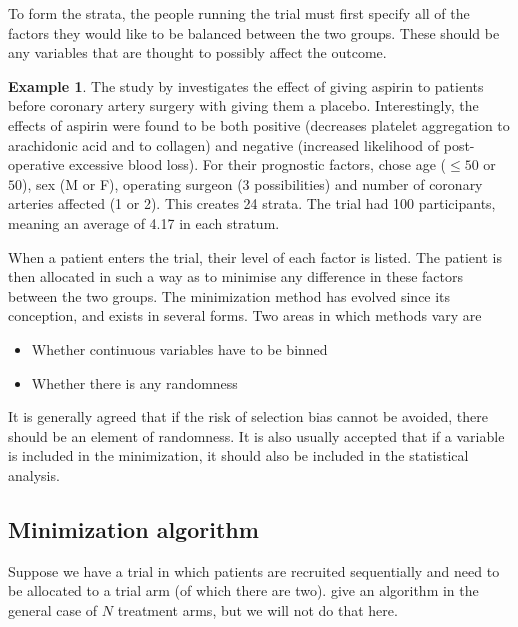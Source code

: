\documentclass[
  openany]{book}
\providecommand{\tightlist}{%
  \setlength{\itemsep}{0pt}\setlength{\parskip}{0pt}}
\theoremstyle{definition}
\theoremstyle{definition}
\newtheorem{example}{Example}[chapter]
\theoremstyle{definition}
\theoremstyle{definition}
\theoremstyle{remark}
\begin{document}
To form the strata, the people running the trial must first specify all of the factors they would like to be balanced between the two groups. These should be any variables that are thought to possibly affect the outcome.

\begin{example}
The study by \citet{kallis1994pre} investigates the effect of giving aspirin to patients before coronary artery surgery with giving them a placebo. Interestingly, the effects of aspirin were found to be both positive (decreases platelet aggregation to arachidonic acid and to collagen) and negative (increased likelihood of post-operative excessive blood loss).
For their prognostic factors, \citet{kallis1994pre} chose age (\(\leq{50}\) or \(50\)), sex (M or F), operating surgeon (3 possibilities) and number of coronary arteries affected (1 or 2). This creates 24 strata. The trial had 100 participants, meaning an average of 4.17 in each stratum.
\end{example}

When a patient enters the trial, their level of each factor is listed. The patient is then allocated in such a way as to minimise any difference in these factors between the two groups. The minimization method has evolved since its conception, and exists in several forms. Two areas in which methods vary are

\begin{itemize}
\tightlist
\item
  Whether continuous variables have to be binned
\item
  Whether there is any randomness
\end{itemize}

It is generally agreed that if the risk of selection bias cannot be avoided, there should be an element of randomness. It is also usually accepted that if a variable is included in the minimization, it should also be included in the statistical analysis.

\hypertarget{minimization-algorithm}{%
\subsection{Minimization algorithm}\label{minimization-algorithm}}

Suppose we have a trial in which patients are recruited sequentially and need to be allocated to a trial arm (of which there are two). \citet{pocock1975sequential} give an algorithm in the general case of \(N\) treatment arms, but we will not do that here.
\end{document}
